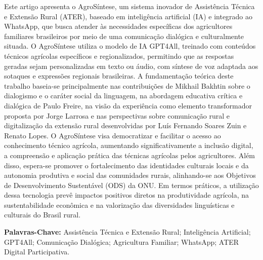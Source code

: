 	\begin{resumo}
		Este artigo apresenta o AgroSíntese, um sistema inovador de Assistência Técnica e Extensão Rural (ATER), baseado em inteligência artificial (IA) e integrado ao WhatsApp, que busca atender às necessidades específicas dos agricultores familiares brasileiros por meio de uma comunicação dialógica e culturalmente situada. O AgroSíntese utiliza o modelo de IA GPT4All, treinado com conteúdos técnicos agrícolas específicos e regionalizados, permitindo que as respostas geradas sejam personalizadas em texto ou áudio, com síntese de voz adaptada aos sotaques e expressões regionais brasileiras. A fundamentação teórica deste trabalho baseia-se principalmente nas contribuições de Mikhail Bakhtin sobre o dialogismo e o caráter social da linguagem, na abordagem educativa crítica e dialógica de Paulo Freire, na visão da experiência como elemento transformador proposta por Jorge Larrosa e nas perspectivas sobre comunicação rural e digitalização da extensão rural desenvolvidas por Luís Fernando Soares Zuin e Renato Lopes. O AgroSíntese visa democratizar e facilitar o acesso ao conhecimento técnico agrícola, aumentando significativamente a inclusão digital, a compreensão e aplicação prática das técnicas agrícolas pelos agricultores. Além disso, espera-se promover o fortalecimento das identidades culturais locais e da autonomia produtiva e social das comunidades rurais, alinhando-se aos Objetivos de Desenvolvimento Sustentável (ODS) da ONU. Em termos práticos, a utilização dessa tecnologia prevê impactos positivos diretos na produtividade agrícola, na sustentabilidade econômica e na valorização das diversidades linguísticas e culturais do Brasil rural.
		
		\vspace*{0.5cm}
		
		\noindent\textbf{{Palavras-Chave: }} Assistência Técnica e Extensão Rural; Inteligência Artificial; GPT4All; Comunicação Dialógica; Agricultura Familiar; WhatsApp; ATER Digital Participativa.
		
	\end{resumo}
	
	
